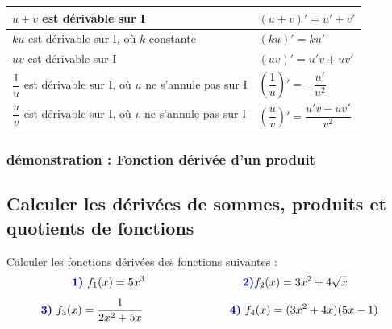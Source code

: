 \begin{center}
	\setlength{\arrayrulewidth}{1pt}
	\renewcommand{\arraystretch}{2.5}
	\begin{tabular}{| >{}C{10cm} | >{}C{5cm} | }
		\hline$u+v$ est dérivable sur I & $(u+v)'=u'+v'$ \\
		\hline$ku$ est dérivable sur I, où $k$ constante & $(ku)'=ku'$ \\
		\hline$uv$ est dérivable sur I & $(uv)'=u'v+uv'$ \\
		\hline$\dfrac{1}{u}$ est dérivable sur I, où $u$ ne s'annule pas sur I & $\left(\dfrac{1}{u}\right)'=-\dfrac{u'}{u^2}$ \\
		\hline$\dfrac{u}{v}$ est dérivable sur I, où $v$ ne s'annule pas sur I & $\left(\dfrac{u}{v}\right)'=\dfrac{u'v-uv'}{v^2}$ \\
		\hline
	\end{tabular}
\end{center}

\subsubsection{démonstration : Fonction dérivée d'un produit}
\begin{bdemo}
	\pointille[\textwidth-1cm]
\end{bdemo}

\subsection{Calculer les dérivées de sommes, produits et quotients de fonctions}

\begin{bmethode}
Calculer les fonctions dérivées des fonctions suivantes :
\[\mBleu{1)}\ f_1(x)=5x^3\ \ \ \ \ \ \ \ \ \ \ \ \ \ \ \ \ \ \ \ \ \ \ \ \ \ \mBleu{2)} f_2(x)=3x^2+4\sqrt{x}\]
\[\mBleu{3)}\  f_3(x)=\dfrac{1}{2x^2+5x}\ \ \ \ \ \ \ \ \  \ \ \ \ \ \ \ \ \ \ \ \ \ \ \mBleu{4)}\ f_4 (x)=(3x^2+4x)(5x-1)\]

\pointille[\textwidth-1cm]
\end{bmethode}


